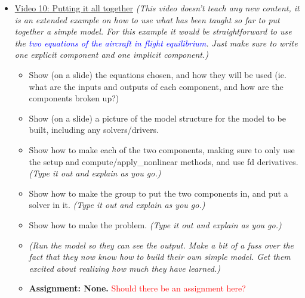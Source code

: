\documentclass[12pt, letterpaper]{article}
\begin{document}
\begin{itemize}
	\item \underline{Video 10: Putting it all together} \textit{(This video doesn’t teach any new content, it is an extended example on how to use what has been taught so far to put together a simple model. For this example it would be straightforward to use the \textcolor{blue}{two equations of the aircraft in flight equilibrium}. Just make sure to write one explicit component and one implicit component.)}
		\begin{itemize}
			\item Show (on a slide) the equations chosen, and how they will be used (ie. what are the inputs and outputs of each component, and how are the components broken up?)
			\item Show (on a slide) a picture of the model structure for the model to be built, including any solvers/drivers.
			\item Show how to make each of the two components, making sure to only use the setup and compute/apply\_nonlinear methods, and use fd derivatives. \textit{(Type it out and explain as you go.)}
			\item Show how to make the group to put the two components in, and put a solver in it. \textit{(Type it out and explain as you go.)}
			\item Show how to make the problem. \textit{(Type it out and explain as you go.)}
			\item \textit{(Run the model so they can see the output. Make a bit of a fuss over the fact that they now know how to build their own simple model. Get them excited about realizing how much they have learned.)}
			\item \textbf{Assignment: None.} \textcolor{red}{Should there be an assignment here?}
		\end{itemize}
		

\end{itemize}
\end{document}
